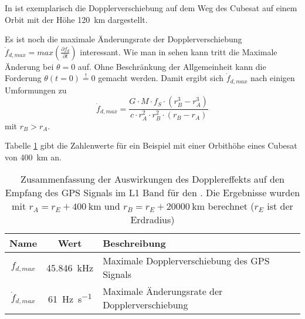 
In  ist exemplarisch die Dopplerverschiebung auf dem Weg des Cubesat auf einem Orbit mit der Höhe \SI{120}{\km} dargestellt. 


Es ist noch die maximale Änderungsrate der Dopplerverschiebung  $\dot f_{d,max}=max\left(\frac{\partial f_d}{\partial t}\right)$ interessant.  Wie man in  sehen kann tritt die Maximale Änderung bei $\theta=0$ auf. Ohne Beschränkung der Allgemeinheit kann die Forderung $\theta(t=0)\overset{!}{=}0$ gemacht werden. Damit ergibt sich $\dot f_{d,max}$ nach einigen Umformungen zu
\begin{equation}
	\dot f_{d,max}= \frac{G \cdot  M \cdot  f_S \cdot  (r_B^3-r_A^3)}{c \cdot  r_A^2 \cdot  r_B^2\cdot  (r_B-r_A)}
\end{equation}
mit $r_B>r_A$.

Tabelle \ref{TabDoppler} gibt die Zahlenwerte für ein Beispiel mit einer Orbithöhe eines Cubesat von \SI{400}{km} an.

\begin{table}[htbp]
    \ttabbox
    {
        \caption[Dopplereffekt für GPS Signal im \dscubesat]{Zusammenfassung der Auswirkungen des Dopplereffekts auf den Empfang des GPS Signals im L1 Band für den \dscubesat. Die Ergebnisse wurden mit $r_A=r_E+\SI{400}{\km}$ und $r_B=r_E+\SI{20000}{\km}$ berechnet ($r_E$ ist der Erdradius)}
        \label{TabDoppler}
    }
    {
    \begin{tabular}{c c p{5.5cm}}
        \toprule
        Name             & Wert & Beschreibung \\
        \midrule
        $f_{d,max}$ & \SI{45.846}{\kHz} &  Maximale Dopplerverschiebung des GPS Signals\\
        $\dot f_{d,max}$ & \SI{61}{\Hz\per\second}& Maximale Änderungsrate der Dopplerverschiebung \\
        \bottomrule
    \end{tabular}
}
\end{table}
